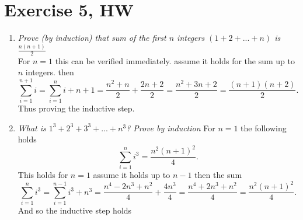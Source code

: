 \documentclass{amsart}
\begin{document}
\section{Exercise 5, HW}
    \begin{enumerate}
        \item \emph{
                Prove (by induction) that sum of the first $n$ integers
                $(1+2+...+n)$ is $\frac{n(n+1)}{2}$
            }\\
            For $n=1$ this can be verified immediately.
            assume it holds for the sum up to $n$ integers.
            then
            \[
            \sum_{i=1}^{n+1}i = \sum_{i=1}^{n}i + n+1 = \frac{n^2+n}{2} + \frac{2n+2}{2} = \frac{n^2+3n+2}{2} = \frac{(n+1)(n+2)}{2}
            .\] 
            Thus proving the inductive step.
        \item \emph{
                What is $1^{3} + 2^{3} + 3^{3} + ... + n^{3}$? Prove by induction
                }
                For $n = 1$ the following holds
                \[
                \sum_{i=1}^{n}i^{3} = \frac{n^2(n+1)^2}{4}
                .\] 
                This  holds for $n = 1$ assume it holds up to $n-1$ then the sum
                \[
                \sum_{i=1}^{n}i^{3} = \sum_{i=1}^{n-1}i^{3} + n^{3} = \frac{n^{4}-2n^{3}+n^2}{4} + \frac{4n^{3}}{4} = \frac{n^{4}+2n^{3}+n^2}{4} = \frac{n^2(n+1)^2}{4}
                .\] 
                And so the inductive step holds
    \end{enumerate}
\end{document}
